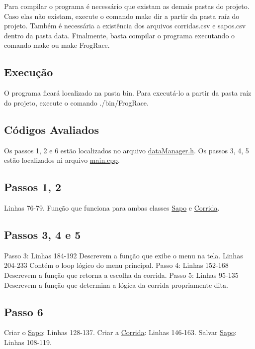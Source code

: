 Para compilar o programa é necessário que existam as demais pastas do projeto. Caso elas não existam, execute o comando \textquotesingle{}make dir\textquotesingle{} a partir da pasta raíz do projeto. Também é necessária a existência dos arquivos corridas.\+csv e sapos.\+csv dentro da pasta data. Finalmente, basta compilar o programa executando o comando \textquotesingle{}make\textquotesingle{} ou \textquotesingle{}make Frog\+Race\textquotesingle{}.

\subsection*{Execução}

O programa ficará localizado na pasta bin. Para executá-\/lo a partir da pasta raíz do projeto, execute o comando \textquotesingle{}./bin/\+Frog\+Race\textquotesingle{}.

\subsection*{Códigos Avaliados}

Os passos 1, 2 e 6 estão localizados no arquivo \hyperlink{dataManager_8h}{data\+Manager.\+h}. Os passos 3, 4, 5 estão localizados ni arquivo \hyperlink{main_8cpp}{main.\+cpp}.

\subsection*{Passos 1, 2}

Linhas 76-\/79. Função que funciona para ambas classes \hyperlink{classSapo}{Sapo} e \hyperlink{classCorrida}{Corrida}.

\subsection*{Passos 3, 4 e 5}

Passo 3\+: Linhas 184-\/192 Descrevem a função que exibe o menu na tela. Linhas 204-\/233 Contém o loop lógico do menu principal. Passo 4\+: Linhas 152-\/168 Descrevem a função que retorna a escolha da corrida. Passo 5\+: Linhas 95-\/135 Descrevem a função que determina a lógica da corrida propriamente dita.

\subsection*{Passo 6}

Criar o \hyperlink{classSapo}{Sapo}\+: Linhas 128-\/137. Criar a \hyperlink{classCorrida}{Corrida}\+: Linhas 146-\/163. Salvar \hyperlink{classSapo}{Sapo}\+: Linhas 108-\/119. 